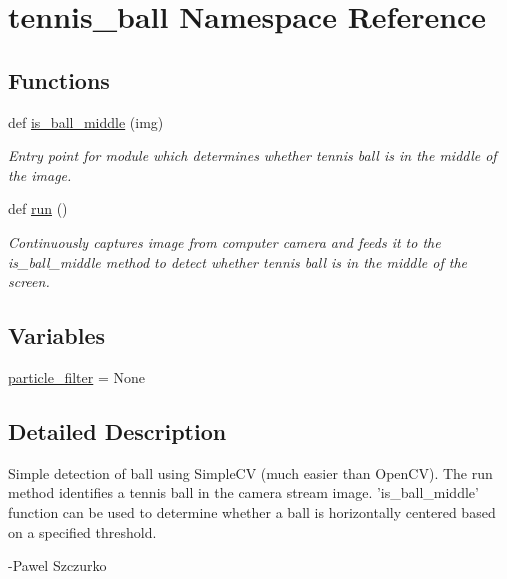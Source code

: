 \section{tennis\+\_\+ball Namespace Reference}
\label{namespacetennis__ball}
\subsection*{Functions}
\begin{DoxyCompactItemize}
\item 
def \hyperlink{namespacetennis__ball_a595850f165f1ae2c78218d580854bfda}{is\+\_\+ball\+\_\+middle} (img)
\begin{DoxyCompactList}\small\item\em Entry point for module which determines whether tennis ball is in the middle of the image. \end{DoxyCompactList}\item 
def \hyperlink{namespacetennis__ball_af2aced0030d28f7b0b98175dd3a3d97c}{run} ()
\begin{DoxyCompactList}\small\item\em Continuously captures image from computer camera and feeds it to the is\+\_\+ball\+\_\+middle method to detect whether tennis ball is in the middle of the screen. \end{DoxyCompactList}\end{DoxyCompactItemize}
\subsection*{Variables}
\begin{DoxyCompactItemize}
\item 
\hyperlink{namespacetennis__ball_aba3913b89ed8c5fae700b6dfbca98f05}{particle\+\_\+filter} = None
\end{DoxyCompactItemize}


\subsection{Detailed Description}
\begin{DoxyVerb}Simple detection of ball using SimpleCV (much easier than OpenCV). The run method
identifies a tennis ball in the camera stream image. 'is_ball_middle' function
can be used to determine whether a ball is horizontally centered based on a specified
threshold.

-Pawel Szczurko
\end{DoxyVerb}
 

